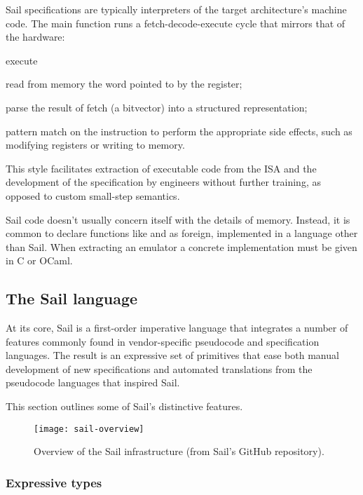 Sail specifications are typically interpreters of the target architecture's machine code. The main function runs a fetch-decode-execute cycle that mirrors that of the hardware:
\begin{labeling}[~--]{execute}
\item[fetch] read from memory the word pointed to by the  register;
\item[decode] parse the result of fetch (a bitvector) into a structured representation;
\item[execute] pattern match on the instruction to perform the appropriate side effects, such as modifying registers or writing to memory.
\end{labeling}

This style facilitates extraction of executable code from the ISA and the development of the specification by engineers without further training, as opposed to \eg custom small-step semantics.

Sail code doesn't usually concern itself with the details of memory. Instead, it is common to declare functions like  and  as foreign, \ie implemented in a language other than Sail. When extracting an emulator a concrete implementation must be given in C or OCaml.

\subsection{The Sail language}

At its core, Sail is a first-order imperative language that integrates a number of features commonly found in vendor-specific pseudocode and specification languages. The result is an expressive set of primitives that ease both manual development of new specifications and automated translations from the pseudocode languages that inspired Sail.

This section outlines some of Sail's distinctive features.

\begin{figure}
  \centering
  \texttt{[image: sail-overview]}
  \caption{Overview of the Sail infrastructure (from Sail's GitHub repository).}
  \label{fig:sail-overview}
\end{figure}

\subsubsection{Expressive types}

